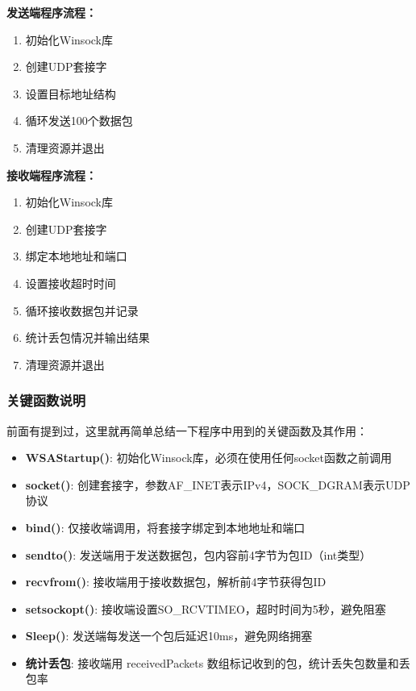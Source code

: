 \documentclass[a4paper]{article}
\begin{document}
\noindent
\begin{minipage}[t]{0.48\textwidth}
\begin{myquote}
\textbf{发送端程序流程：}
\begin{enumerate}
    \item 初始化Winsock库
    \item 创建UDP套接字
    \item 设置目标地址结构
    \item 循环发送100个数据包
    \item 清理资源并退出
\end{enumerate}
\end{myquote}
\end{minipage}
\hfill
\begin{minipage}[t]{0.48\textwidth}
\begin{myquote}
\textbf{接收端程序流程：}
\begin{enumerate}
    \item 初始化Winsock库
    \item 创建UDP套接字
    \item 绑定本地地址和端口
    \item 设置接收超时时间
    \item 循环接收数据包并记录
    \item 统计丢包情况并输出结果
    \item 清理资源并退出
\end{enumerate}
\end{myquote}
\end{minipage}


\subsubsection{关键函数说明}

前面有提到过，这里就再简单总结一下程序中用到的关键函数及其作用：

\begin{itemize}
    \item \textbf{WSAStartup()}: 初始化Winsock库，必须在使用任何socket函数之前调用
    \item \textbf{socket()}: 创建套接字，参数AF\_INET表示IPv4，SOCK\_DGRAM表示UDP协议
    \item \textbf{bind()}: 仅接收端调用，将套接字绑定到本地地址和端口
    \item \textbf{sendto()}: 发送端用于发送数据包，包内容前4字节为包ID（int类型）
    \item \textbf{recvfrom()}: 接收端用于接收数据包，解析前4字节获得包ID
    \item \textbf{setsockopt()}: 接收端设置SO\_RCVTIMEO，超时时间为5秒，避免阻塞
    \item \textbf{Sleep()}: 发送端每发送一个包后延迟10ms，避免网络拥塞
    \item \textbf{统计丢包}: 接收端用 receivedPackets 数组标记收到的包，统计丢失包数量和丢包率
\end{itemize}
\end{document}
